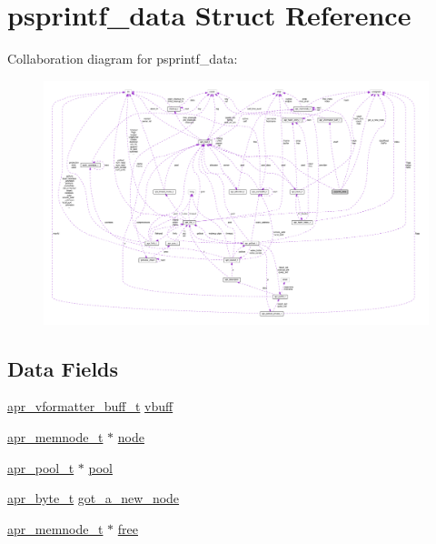 \hypertarget{structpsprintf__data}{}\section{psprintf\+\_\+data Struct Reference}
\label{structpsprintf__data}


Collaboration diagram for psprintf\+\_\+data\+:
\nopagebreak
\begin{figure}[H]
\begin{center}
\leavevmode
\includegraphics[width=350pt]{structpsprintf__data__coll__graph}
\end{center}
\end{figure}
\subsection*{Data Fields}
\begin{DoxyCompactItemize}
\item 
\hyperlink{structapr__vformatter__buff__t}{apr\+\_\+vformatter\+\_\+buff\+\_\+t} \hyperlink{structpsprintf__data_ae612062a52a2e9217811a6ce0dc642b0}{vbuff}
\item 
\hyperlink{structapr__memnode__t}{apr\+\_\+memnode\+\_\+t} $\ast$ \hyperlink{structpsprintf__data_a3fa993ff0aa839c509b3f55f9dc07d35}{node}
\item 
\hyperlink{structapr__pool__t}{apr\+\_\+pool\+\_\+t} $\ast$ \hyperlink{structpsprintf__data_af9f6c59c5c17a48c14fd34b1a5172885}{pool}
\item 
\hyperlink{group__apr__platform_gadcfa334915b4605a0052cb4ca542eb3a}{apr\+\_\+byte\+\_\+t} \hyperlink{structpsprintf__data_a54030fd547a8f9cc1666d24a3dc09d30}{got\+\_\+a\+\_\+new\+\_\+node}
\item 
\hyperlink{structapr__memnode__t}{apr\+\_\+memnode\+\_\+t} $\ast$ \hyperlink{structpsprintf__data_a84b6ea2748ea334f5ddf9280fd701f3c}{free}
\end{DoxyCompactItemize}


